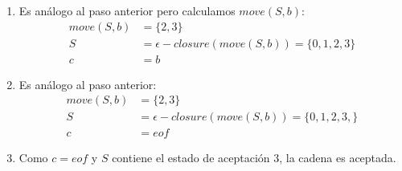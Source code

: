 \begin{itemize}
\begin{enumerate}
        \item Es análogo al paso anterior pero calculamos $move(S, b)$:
        \begin{align*}
            move(S, b) &= \{2, 3\} \\
            S &= \epsilon-closure (move(S, b)) = \{0, 1, 2, 3\} \\
            c &= b
        \end{align*}
        \item Es análogo al paso anterior:
        \begin{align*}
            move(S, b) &= \{2,3\} \\
            S &= \epsilon-closure (move(S, b)) = \{0, 1, 2, 3, \} \\
            c &= eof
        \end{align*}
        \item Como $c = eof$ y $S$ contiene el estado de aceptación $3$, la cadena es aceptada.
    \end{enumerate}

        
\end{itemize}
